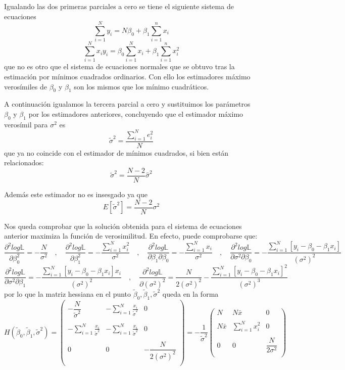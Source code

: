 \documentclass[10pt,a4paper]{book}
\begin{document}
Igualando las dos primeras parciales a cero se tiene el siguiente sistema de ecuaciones $$\sum^N_{i=1}y_i=N\beta_0+\beta_1\sum^n_{i=1}x_i$$ $$\sum^N_{i=1}x_iy_i=\beta_0\sum^N_{i=1}x_i+\beta_1\sum^n_{i=1}x^2_i$$ que no es otro que el sistema de ecuaciones normales que se obtuvo tras la estimación por mínimos cuadrados ordinarios. Con ello los estimadores máximo verosímiles de $\beta_0$ y $\beta_1$ son los mismos que los mínimo cuadráticos.

A continuación igualamos la tercera parcial a cero y sustituimos los parámetros $\beta_0$ y $\beta_1$ por los estimadores anteriores, concluyendo que el estimador máximo verosímil para $\sigma^2$ es $$\tilde{\sigma}^2=\dfrac{\displaystyle\sum^N_{i=1}e^2_i}{N}$$ que ya no coincide con el estimador de mínimos cuadrados, si bien están relacionados: $$\tilde{\sigma}^2=\dfrac{N-2}{N}\widehat{\sigma}^2$$

Además este estimador no es insesgado ya que $$E[\tilde{\sigma}^2]=\dfrac{N-2}{N}\sigma^2$$

Nos queda comprobar que la solución obtenida para el sistema de ecuaciones anterior maximiza la función de verosimilitud. En efecto, puede comprobarse que:$$\dfrac{\partial^2log\mathbb{L}}{\partial\beta^2_0}=-\dfrac{N}{\sigma^2}\quad ,\quad \dfrac{\partial^2log\mathbb{L}}{\partial\beta^2_1}=-\dfrac{\displaystyle\sum^N_{i=1}x^2_i}{\sigma^2}\quad ,\quad \dfrac{\partial^2log\mathbb{L}}{\partial\beta_1\partial\beta_0}=-\dfrac{\displaystyle\sum^N_{i=1}x_i}{\sigma^2}\quad ,\quad \dfrac{\partial^2log\mathbb{L}}{\partial\sigma^2\partial\beta_0}=-\dfrac{\displaystyle\sum^N_{i=1}[y_i-\beta_0-\beta_1x_i]}{(\sigma^2)^2}$$ $$\dfrac{\partial^2log\mathbb{L}}{\partial\sigma^2\partial\beta_1}=-\dfrac{\displaystyle\sum^N_{i=1}[y_i-\beta_0-\beta_1x_i]x_i}{(\sigma^2)^2}\quad ,\quad \dfrac{\partial^2log\mathbb{L}}{\partial(\sigma^2)^2}=\dfrac{N}{2(\sigma^2)^2}-\dfrac{\displaystyle\sum^N_{i=1}[y_i-\beta_0-\beta_1x_i]^2}{(\sigma^2)^3}$$ por lo que la matriz hessiana en el punto $\tilde{\beta}_0,\tilde{\beta}_1,\tilde{\sigma}^2$ queda en la forma $$H(\tilde{\beta}_0,\tilde{\beta}_1,\tilde{\sigma}^2)= \left( \begin{array}{ccc}
-\dfrac{N}{\tilde{\sigma}^2} & -\displaystyle\sum^N_{i=1}\frac{x_i}{\tilde{\sigma}^2} & 0\\
 & & \\
-\displaystyle\sum^N_{i=1}\frac{x_i}{\tilde{\sigma}^2} & -\displaystyle\sum^N_{i=1}\frac{x_i}{\tilde{\sigma}^2} & 0\\
 & & \\
0 & 0 & -\dfrac{N}{2(\sigma^2)^2}\\
\end{array} \right)=-\dfrac{1}{\tilde{\sigma}^2}\left( \begin{array}{ccc}
N & N\bar{x} & 0\\
 & & \\
N\bar{x} & \displaystyle\sum^N_{i=1}x^2_i & 0\\
 & & \\
0 & 0 & \dfrac{N}{2\sigma^2}\\
\end{array} \right)$$ 
\end{document}

